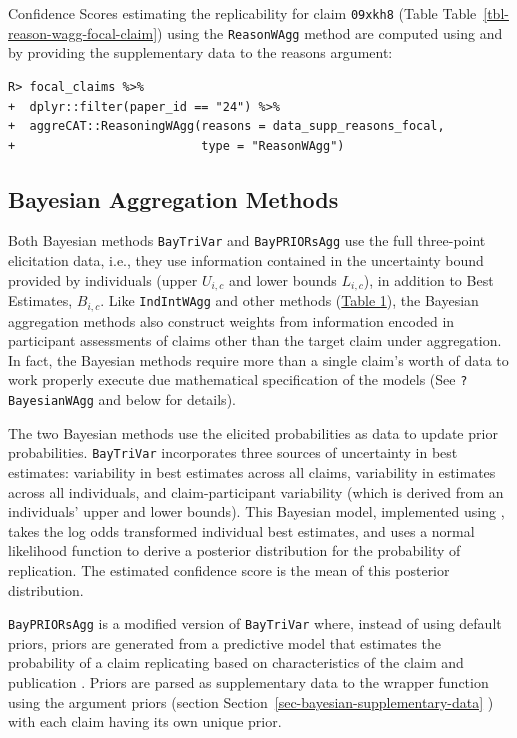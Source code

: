 \documentclass[article]{jss}
\newcommand{\fct}[1]{\code{#1()}}
\begin{document}
Confidence Scores estimating the replicability for claim \texttt{09xkh8}
(Table Table~\ref{tbl-reason-wagg-focal-claim}) using the
\texttt{ReasonWAgg} method are computed using \fct{ReasoningWAgg} and by
providing the supplementary data to the {reasons} argument:

\begin{verbatim}
R> focal_claims %>% 
+  dplyr::filter(paper_id == "24") %>% 
+  aggreCAT::ReasoningWAgg(reasons = data_supp_reasons_focal,
+                          type = "ReasonWAgg")
\end{verbatim}

\hypertarget{bayesian-aggregation-methods}{%
\subsection{Bayesian Aggregation
Methods}\label{bayesian-aggregation-methods}}

Both Bayesian methods \texttt{BayTriVar} and \texttt{BayPRIORsAgg} use
the full three-point elicitation data, i.e., they use information
contained in the uncertainty bound provided by individuals (upper
\({U}_{i,c}\) and lower bounds \({L}_{i,c}\)), in addition to Best
Estimates, \(B_{i,c}\). Like \texttt{IndIntWAgg} and other methods
(\protect\hyperlink{table1}{Table 1}), the Bayesian aggregation methods
also construct weights from information encoded in participant
assessments of claims other than the target claim under aggregation. In
fact, the Bayesian methods require more than a single claim's worth of
data to work properly execute due mathematical specification of the
models (See \texttt{?BayesianWAgg} and below for details).

The two Bayesian methods use the elicited probabilities as data to
update prior probabilities. \texttt{BayTriVar} incorporates three
sources of uncertainty in best estimates: variability in best estimates
across all claims, variability in estimates across all individuals, and
claim-participant variability (which is derived from an individuals'
upper and lower bounds). This Bayesian model, implemented using
\citep{R2JAGS}, takes the log odds transformed individual
best estimates, and uses a normal likelihood function to derive a
posterior distribution for the probability of replication. The estimated
confidence score is the mean of this posterior distribution.

\texttt{BayPRIORsAgg} is a modified version of \texttt{BayTriVar} where,
instead of using default priors, priors are generated from a predictive
model that estimates the probability of a claim replicating based on
characteristics of the claim and publication \citep{Gould2021a}. Priors
are parsed as supplementary data to the wrapper function
\fct{BayesianWAgg} using the argument {priors} (section
Section~\ref{sec-bayesian-supplementary-data} ) with each claim having
its own unique prior.
\end{document}
